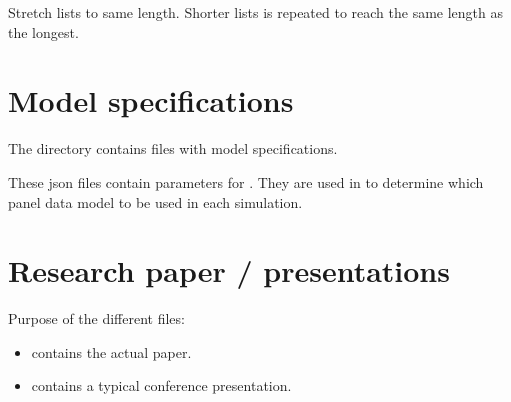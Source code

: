 \documentclass[a4paper,11pt,english]{sphinxmanual}
\begin{document}

\begin{fulllineitems}
\label{\detokenize{model_code:src.model_code.utils.stretch}}
\sphinxAtStartPar
Stretch lists to same length.
Shorter lists is repeated to reach the same length as the longest.

\end{fulllineitems}



\chapter{Model specifications}
\label{\detokenize{model_specs:model-specifications}}\label{\detokenize{model_specs:id1}}\label{\detokenize{model_specs::doc}}
\sphinxAtStartPar
The directory  contains  files with model specifications.

\sphinxAtStartPar
These json files contain parameters for {\hyperref[\detokenize{analysis:src-analysis-simulation}]{}}.
They are used in {\hyperref[\detokenize{analysis:src-analysis-task-simulation-coefficient}]{}} to determine which panel data model to be used in each simulation.


\chapter{Research paper / presentations}
\label{\detokenize{paper:research-paper-presentations}}\label{\detokenize{paper:paper}}\label{\detokenize{paper::doc}}
\sphinxAtStartPar
Purpose of the different files:
\begin{itemize}
\item {} 
\sphinxAtStartPar
{} contains the actual paper.

\item {} 
\sphinxAtStartPar
{} contains a typical conference presentation.

\end{itemize}
\end{document}
